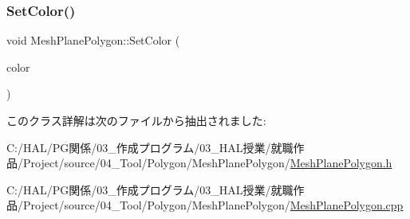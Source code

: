 \mbox{\label{class_mesh_plane_polygon_a514e1738386a6a4be0d37ea38bd425f2}} 
\subsubsection{\texorpdfstring{Set\+Color()}{SetColor()}}
{\footnotesize\ttfamily void Mesh\+Plane\+Polygon\+::\+Set\+Color (\begin{DoxyParamCaption}\item[{\mbox{\hyperlink{_vector3_d_8h_a680c30c4a07d86fe763c7e01169cd6cc}{X\+Color4}}}]{color }\end{DoxyParamCaption})}



このクラス詳解は次のファイルから抽出されました\+:\begin{DoxyCompactItemize}
\item 
C\+:/\+H\+A\+L/\+P\+G関係/03\+\_\+作成プログラム/03\+\_\+\+H\+A\+L授業/就職作品/\+Project/source/04\+\_\+\+Tool/\+Polygon/\+Mesh\+Plane\+Polygon/\mbox{\hyperlink{_mesh_plane_polygon_8h}{Mesh\+Plane\+Polygon.\+h}}\item 
C\+:/\+H\+A\+L/\+P\+G関係/03\+\_\+作成プログラム/03\+\_\+\+H\+A\+L授業/就職作品/\+Project/source/04\+\_\+\+Tool/\+Polygon/\+Mesh\+Plane\+Polygon/\mbox{\hyperlink{_mesh_plane_polygon_8cpp}{Mesh\+Plane\+Polygon.\+cpp}}\end{DoxyCompactItemize}
